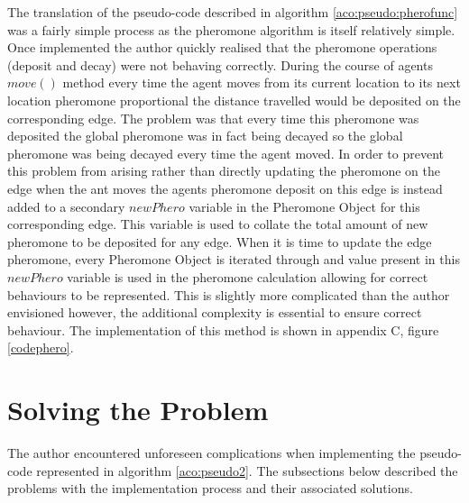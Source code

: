 The translation of the pseudo-code described in algorithm \ref{aco:pseudo:pherofunc} was a fairly simple process as the pheromone algorithm is itself relatively simple. Once implemented the author quickly realised that the pheromone operations (deposit and decay) were not behaving correctly. During the course of agents $move()$ method every time the agent moves from its current location to its next location pheromone proportional the distance travelled would be deposited on the corresponding edge. The problem was that every time this pheromone was deposited the global pheromone was in fact being decayed so the global pheromone was being decayed every time the agent moved. In order to prevent this problem from arising rather than directly updating the pheromone on the edge when the ant moves the agents pheromone deposit on this edge is instead added to a secondary $newPhero$ variable in the Pheromone Object for this corresponding edge. This variable is used to collate the total amount of new pheromone to be deposited for any edge. When it is time to update the edge pheromone, every Pheromone Object is iterated through and value present in this $newPhero$ variable is used in the pheromone calculation allowing for correct behaviours to be represented. This is slightly more complicated than the author envisioned however, the additional complexity is essential to ensure correct behaviour. The implementation of this method is shown in appendix C, figure \ref{codephero}.

\section{Solving the Problem}

The author encountered unforeseen complications when implementing the pseudo-code represented in algorithm \ref{aco:pseudo2}. The subsections below described the problems with the implementation process and their associated solutions.

